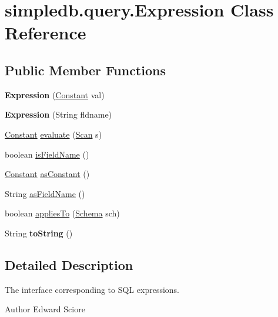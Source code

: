 \hypertarget{classsimpledb_1_1query_1_1Expression}{}\section{simpledb.\+query.\+Expression Class Reference}
\label{classsimpledb_1_1query_1_1Expression}
\subsection*{Public Member Functions}
\begin{DoxyCompactItemize}
\item 
\mbox{\label{classsimpledb_1_1query_1_1Expression_a92c2ebc70f7be8829a829c74ac740882}} 
{\bfseries Expression} (\hyperlink{classsimpledb_1_1query_1_1Constant}{Constant} val)
\item 
\mbox{\label{classsimpledb_1_1query_1_1Expression_a8e698f09b08ea05ba7c384d6eabc09ea}} 
{\bfseries Expression} (String fldname)
\item 
\hyperlink{classsimpledb_1_1query_1_1Constant}{Constant} \hyperlink{classsimpledb_1_1query_1_1Expression_a09021c7fb93aa5530f6b5ddccde46a2c}{evaluate} (\hyperlink{interfacesimpledb_1_1query_1_1Scan}{Scan} s)
\item 
boolean \hyperlink{classsimpledb_1_1query_1_1Expression_a9bbaeb4fd94c01671e8207ba95ddd808}{is\+Field\+Name} ()
\item 
\hyperlink{classsimpledb_1_1query_1_1Constant}{Constant} \hyperlink{classsimpledb_1_1query_1_1Expression_a493dcabb0b3952c3188ab2de5814b344}{as\+Constant} ()
\item 
String \hyperlink{classsimpledb_1_1query_1_1Expression_ae4d3c3da3385d0ee2f5a741e46625403}{as\+Field\+Name} ()
\item 
boolean \hyperlink{classsimpledb_1_1query_1_1Expression_a6ff0d7022de12290e82bd0aabd9a0449}{applies\+To} (\hyperlink{classsimpledb_1_1record_1_1Schema}{Schema} sch)
\item 
\mbox{\label{classsimpledb_1_1query_1_1Expression_a30112b758164604a986330de50693647}} 
String {\bfseries to\+String} ()
\end{DoxyCompactItemize}


\subsection{Detailed Description}
The interface corresponding to S\+QL expressions. \begin{DoxyAuthor}{Author}
Edward Sciore 
\end{DoxyAuthor}


